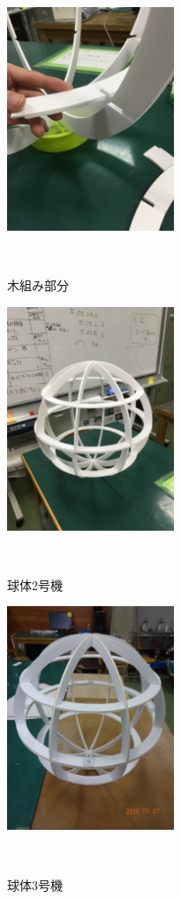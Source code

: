 \documentclass[a4paper]{jarticle}
\begin{document}
\begin{figure}[b]
 \begin{center}
  \includegraphics[width=50mm]{image/kigumi.JPG}
 　\caption{木組み部分}
 　\label{fig:kigumi}
 \end{center}
\end{figure}

\begin{figure}[b]
 \begin{center}
  \includegraphics[width=50mm]{image/sphere-2.JPG}
 　\caption{球体2号機}
 　\label{fig:sphere-2}
 \end{center}
\end{figure}

\begin{figure}[b]
 \begin{center}
  \includegraphics[width=50mm]{image/sphere-3.JPG}
 　\caption{球体3号機}
 　\label{fig:sphere-3}
 \end{center}
\end{figure}
\end{document}
